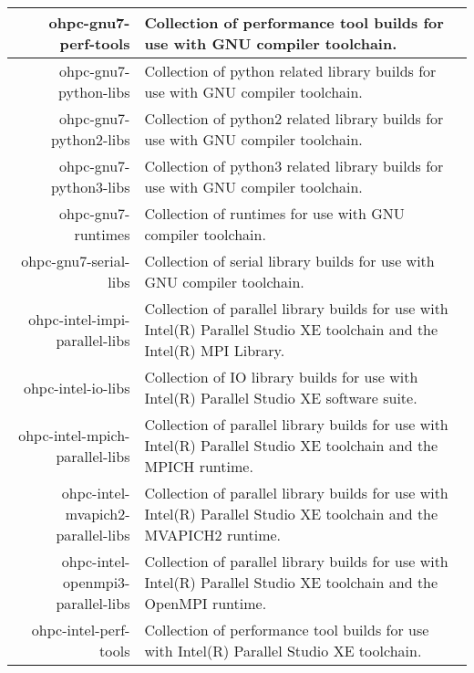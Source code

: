\begin{tabularx}{\textwidth}{r|X}
\hline
ohpc-gnu7-perf-tools & Collection of performance tool builds for use with GNU compiler toolchain. \\ 
\hline
ohpc-gnu7-python-libs & Collection of python related library builds for use with GNU compiler toolchain. \\ 
\hline
ohpc-gnu7-python2-libs & Collection of python2 related library builds for use with GNU compiler toolchain. \\ 
\hline
ohpc-gnu7-python3-libs & Collection of python3 related library builds for use with GNU compiler toolchain. \\ 
\hline
ohpc-gnu7-runtimes & Collection of runtimes for use with GNU compiler toolchain. \\ 
\hline
ohpc-gnu7-serial-libs & Collection of serial library builds for use with GNU compiler toolchain. \\ 
\hline
ohpc-intel-impi-parallel-libs & Collection of parallel library builds for use with Intel(R) Parallel Studio XE toolchain and the Intel(R) MPI Library. \\ 
\hline
ohpc-intel-io-libs & Collection of IO library builds for use with Intel(R) Parallel Studio XE software suite. \\ 
\hline
ohpc-intel-mpich-parallel-libs & Collection of parallel library builds for use with Intel(R) Parallel Studio XE toolchain and the MPICH runtime. \\ 
\hline
ohpc-intel-mvapich2-parallel-libs & Collection of parallel library builds for use with Intel(R) Parallel Studio XE toolchain and the MVAPICH2 runtime. \\ 
\hline
ohpc-intel-openmpi3-parallel-libs & Collection of parallel library builds for use with Intel(R) Parallel Studio XE toolchain and the OpenMPI runtime. \\ 
\hline
ohpc-intel-perf-tools & Collection of performance tool builds for use with Intel(R) Parallel Studio XE toolchain. \\ 
\hline
\bottomrule
\end{tabularx}
